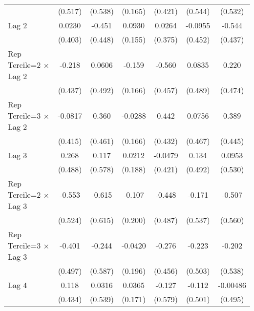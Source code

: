 \begin{table}[htbp]
\begin{tabular}{l*{6}{c}}
                &  (0.517)         &  (0.538)         &  (0.165)         &  (0.421)         &  (0.544)         &  (0.532)         \\
\addlinespace
Lag 2           &   0.0230         &   -0.451         &   0.0930         &   0.0264         &  -0.0955         &   -0.544         \\
                &  (0.403)         &  (0.448)         &  (0.155)         &  (0.375)         &  (0.452)         &  (0.437)         \\
\addlinespace
Rep Tercile=2 $\times$ Lag 2&   -0.218         &   0.0606         &   -0.159         &   -0.560         &   0.0835         &    0.220         \\
                &  (0.437)         &  (0.492)         &  (0.166)         &  (0.457)         &  (0.489)         &  (0.474)         \\
\addlinespace
Rep Tercile=3 $\times$ Lag 2&  -0.0817         &    0.360         &  -0.0288         &    0.442         &   0.0756         &    0.389         \\
                &  (0.415)         &  (0.461)         &  (0.166)         &  (0.432)         &  (0.467)         &  (0.445)         \\
\addlinespace
Lag 3           &    0.268         &    0.117         &   0.0212         &  -0.0479         &    0.134         &   0.0953         \\
                &  (0.488)         &  (0.578)         &  (0.188)         &  (0.421)         &  (0.492)         &  (0.530)         \\
\addlinespace
Rep Tercile=2 $\times$ Lag 3&   -0.553         &   -0.615         &   -0.107         &   -0.448         &   -0.171         &   -0.507         \\
                &  (0.524)         &  (0.615)         &  (0.200)         &  (0.487)         &  (0.537)         &  (0.560)         \\
\addlinespace
Rep Tercile=3 $\times$ Lag 3&   -0.401         &   -0.244         &  -0.0420         &   -0.276         &   -0.223         &   -0.202         \\
                &  (0.497)         &  (0.587)         &  (0.196)         &  (0.456)         &  (0.503)         &  (0.538)         \\
\addlinespace
Lag 4           &    0.118         &   0.0316         &   0.0365         &   -0.127         &   -0.112         & -0.00486         \\
                &  (0.434)         &  (0.539)         &  (0.171)         &  (0.579)         &  (0.501)         &  (0.495)         \\

\end{tabular}
\end{table}

